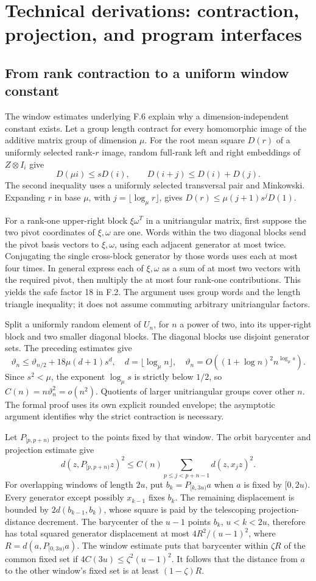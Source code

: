 \documentclass[11pt,letterpaper]{article}
\theoremstyle{definition}\newtheorem{definition}[theorem]{Definition}\newtheorem{example}[theorem]{Example}
\theoremstyle{remark}\newtheorem{remark}[theorem]{Remark}
\begin{document}
\section{Technical derivations: contraction, projection, and program interfaces}\label{sec:contractdetail}
\subsection{From rank contraction to a uniform window constant}\label{sec:windowdetail}
The window estimates underlying F.6 explain why a dimension-independent constant exists. Let a group length contract for every homomorphic image of the additive matrix group of dimension $\mu$. For the root mean square $D(r)$ of a uniformly selected rank-$r$ image, random full-rank left and right embeddings of $Z\otimes I_i$ give
\[
 D(\mu i)\le sD(i),\qquad D(i+j)\le D(i)+D(j).
\]
The second inequality uses a uniformly selected transversal pair and Minkowski. Expanding $r$ in base $\mu$, with $j=\lfloor\log_\mu r\rfloor$, gives $D(r)\le\mu(j+1)s^jD(1)$.

For a rank-one upper-right block $\xi\omega^T$ in a unitriangular matrix, first suppose the two pivot coordinates of $\xi,\omega$ are one. Words within the two diagonal blocks send the pivot basis vectors to $\xi,\omega$, using each adjacent generator at most twice. Conjugating the single cross-block generator by those words uses each at most four times. In general express each of $\xi,\omega$ as a sum of at most two vectors with the required pivot, then multiply the at most four rank-one contributions. This yields the safe factor 18 in F.2. The argument uses group words and the length triangle inequality; it does not assume commuting arbitrary unitriangular factors.

Split a uniformly random element of $U_n$, for $n$ a power of two, into its upper-right block and two smaller diagonal blocks. The diagonal blocks use disjoint generator sets. The preceding estimates give
\[
 \vartheta_n\le\vartheta_{n/2}+18\mu(d+1)s^d,
 \quad d=\lfloor\log_\mu n\rfloor,
 \quad \vartheta_n=O((1+\log n)^2n^{\log_\mu s}).
\]
Since $s^2<\mu$, the exponent $\log_\mu s$ is strictly below $1/2$, so $C(n)=n\vartheta_n^2=o(n^2)$. Quotients of larger unitriangular groups cover other $n$. The formal proof uses its own explicit rounded envelope; the asymptotic argument identifies why the strict contraction is necessary.

Let $P_{[p,p+n)}$ project to the points fixed by that window. The orbit barycenter and projection estimate give
\[
 d(z,P_{[p,p+n)}z)^2\le C(n)\sum_{p\le j<p+n-1}d(z,x_jz)^2.
\]
For overlapping windows of length $2u$, put $b_k=P_{[k,3u)}a$ when $a$ is fixed by $[0,2u)$. Every generator except possibly $x_{k-1}$ fixes $b_k$. The remaining displacement is bounded by $2d(b_{k-1},b_k)$, whose square is paid by the telescoping projection-distance decrement. The barycenter of the $u-1$ points $b_k$, $u<k<2u$, therefore has total squared generator displacement at most $4R^2/(u-1)^2$, where $R=d(a,P_{[0,3u)}a)$. The window estimate puts that barycenter within $\zeta R$ of the common fixed set if $4C(3u)\le\zeta^2(u-1)^2$. It follows that the distance from $a$ to the other window's fixed set is at least $(1-\zeta)R$.
\end{document}
